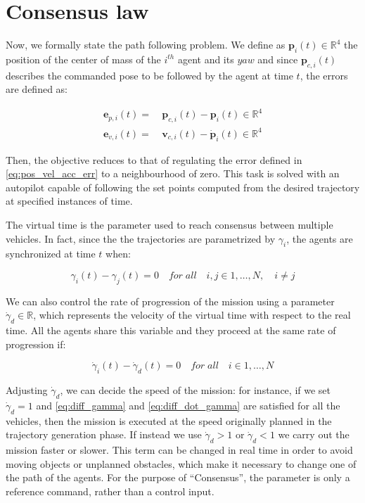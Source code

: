 \section{Consensus law\label{sec:consensus_law}}

Now, we formally state the path following problem. We define as $\bm{p}_i(t) \in \mathbb{R}^4$
the position of the center of mass of the $i^{th}$ agent and its $yaw$ and since $\bm{p}_{c,i}(t)$
describes the commanded pose to be followed by the agent at time $t$, the errors
are defined as:

\begin{equation}  \label{eq:pos_vel_acc_err}
  \begin{aligned}
  \bm{e}_{p,i}(t) = \ & \bm{p}_{c,i}(t) - \bm{p}_i(t) \in  \mathbb{R}^4\\
  \bm{e}_{v,i}(t) = \ & \bm{v}_{c,i}(t) - \dot{\bm{p}}_i(t) \in  \mathbb{R}^4
  \end{aligned}
\end{equation}

Then, the objective reduces to that of regulating the error defined in \eqref{eq:pos_vel_acc_err}
to a neighbourhood of zero.
This task is solved with an autopilot capable of following the set points computed
from the desired trajectory at specified instances of time.

The virtual time is the parameter used to reach consensus between multiple vehicles.
In fact, since the the trajectories are parametrized by $\gamma_i$, the agents are
synchronized at time $t$ when:

\begin{equation} \label{eq:diff_gamma}
  \gamma_i(t) - \gamma_j(t) = 0 \quad for \; all \quad i,j \in {1 , \dots , N}, \quad i \neq j
\end{equation}

We can also control the rate of progression of the mission using a parameter
$\dot{\gamma}_d \in \mathbb{R}$, which represents the velocity of the virtual time
with respect to the real time. All the agents share this variable and they proceed
at the same rate of progression if:

\begin{equation} \label{eq:diff_dot_gamma}
  \dot{\gamma}_i(t) - \dot{\gamma}_d(t) = 0 \quad for \; all \quad i \in {1 , \dots , N}
\end{equation}

Adjusting $\dot{\gamma}_d$, we can decide the speed of the mission: for instance,
if we set $\dot{\gamma}_d = 1$ and \eqref{eq:diff_gamma} and \eqref{eq:diff_dot_gamma}
are satisfied for all the vehicles, then the mission is executed at the speed
originally planned in the trajectory generation phase.
If instead we use $\dot{\gamma}_d > 1$ or $\dot{\gamma}_d < 1$ we carry out the
mission faster or slower.
This term can be changed in real time in order to avoid moving objects or
unplanned obstacles, which make it necessary to change one of the path of the agents.
For the purpose of “Consensus”, the parameter is only a reference command,
rather than a control input.

